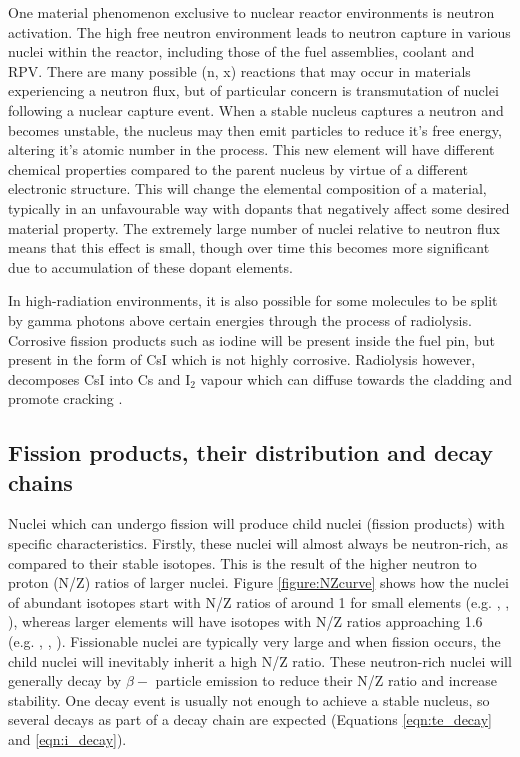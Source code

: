 One material phenomenon exclusive to nuclear reactor environments is neutron activation. The high free neutron environment leads to neutron capture in various nuclei within the reactor, including those of the fuel assemblies, coolant and RPV. There are many possible (n, x) reactions that may occur in materials experiencing a neutron flux, but of particular concern is transmutation of nuclei following a nuclear capture event. When a stable nucleus captures a neutron and becomes unstable, the nucleus may then emit particles to reduce it's free energy, altering it's atomic number in the process. This new element will have different chemical properties compared to the parent nucleus by virtue of a different electronic structure. This will change the elemental composition of a material, typically in an unfavourable way with dopants that negatively affect some desired material property. The extremely large number of nuclei relative to neutron flux means that this effect is small, though over time this becomes more significant due to accumulation of these dopant elements.

In high-radiation environments, it is also possible for some molecules to be split by gamma photons above certain energies through the process of radiolysis. Corrosive fission products such as iodine will be present inside the fuel pin, but present in the form of CsI which is not highly corrosive. Radiolysis however, decomposes CsI into Cs and I$_{2}$ vapour which can diffuse towards the cladding and promote cracking \cite{Konashi1983}.

\subsection{Fission products, their distribution and decay chains}

Nuclei which can undergo fission will produce child nuclei (fission products) with specific characteristics. Firstly, these nuclei will almost always be neutron-rich, as compared to their stable isotopes. This is the result of the higher neutron to proton (N/Z) ratios of larger nuclei. Figure \ref{figure:NZcurve} shows how the nuclei of abundant isotopes start with N/Z ratios of around 1 for small elements (e.g. , , ), whereas larger elements will have isotopes with N/Z ratios approaching 1.6 (e.g. , , ). Fissionable nuclei are typically very large and when fission occurs, the child nuclei will inevitably inherit a high N/Z ratio. These neutron-rich nuclei will generally decay by $\beta-$ particle emission to reduce their N/Z ratio and increase stability. One decay event is usually not enough to achieve a stable nucleus, so several decays as part of a decay chain are expected (Equations \ref{eqn:te_decay} and \ref{eqn:i_decay}).

